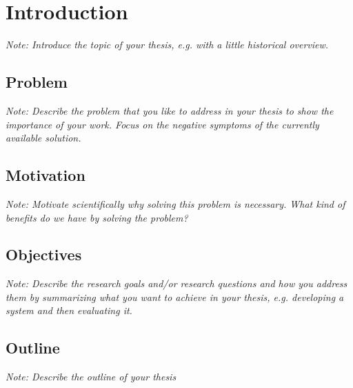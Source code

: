 \documentclass[a4paper,12pt,twoside]{report}
\begin{document}
\begin{acronym}

\end{acronym}


\fancyhead{}
\pagestyle{fancy}
\fancyhead[LE]{\slshape \leftmark}
\fancyhead[RO]{\slshape \rightmark}
\headheight=15pt





\chapter{Introduction}

\textit{Note: Introduce the topic of your thesis, e.g. with a little historical overview.}

\section{Problem}

\textit{Note: Describe the problem that you like to address in your thesis to show the importance of your work. Focus on the negative symptoms of the currently available solution.}

\section{Motivation}

\textit{Note: Motivate scientifically why solving this problem is necessary. What kind of benefits do we have by solving the problem?}

\section{Objectives}

\textit{Note: Describe the research goals and/or research questions and how you address them by summarizing what you want to achieve in your thesis, e.g. developing a system and then evaluating it.}

\section{Outline}

\textit{Note: Describe the outline of your thesis}




\end{document}
